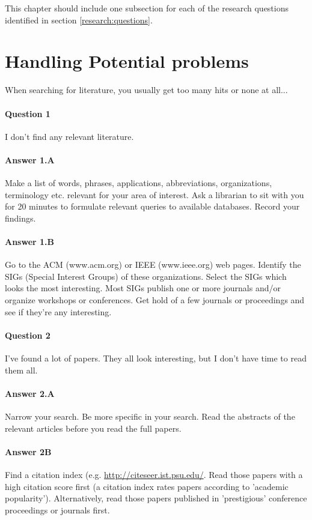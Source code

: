 \documentclass[informationsecurity]{gucmasterproject}
\begin{document}
This chapter should include one subsection for each of the research
questions identified in section \ref{research:questions}.  

\section{Handling Potential problems}
When searching for literature, you usually get too many hits or none at all...

\paragraph{Question 1} I don't find any relevant literature.

\paragraph{Answer 1.A}  Make a list of words, phrases, applications, abbreviations,
organizations, terminology etc. relevant for your area of interest.
Ask a librarian to sit with you for 20 minutes to formulate relevant
queries to available databases.  Record your findings.

\paragraph{Answer 1.B}  Go to the ACM (www.acm.org) or IEEE (www.ieee.org) web pages.
Identify the SIGs (Special Interest Groups) of these organizations.
Select the SIGs which looks the most interesting.
Most SIGs publish one or more journals and/or organize workshops or conferences.
Get hold of a few journals or proceedings and see if they're any interesting.


\paragraph{Question 2}  I've found a lot of papers.
They all look interesting, but I don't have time to read them all.

\paragraph{Answer 2.A}  Narrow your search.  Be more specific in your search.  Read the abstracts of the relevant articles before you read the full papers.

\paragraph{Answer 2B}  Find a citation index (e.g. \url{http://citeseer.ist.psu.edu/}.
Read those papers with a high citation score first
(a citation index rates papers according to 'academic popularity').  Alternatively,
read those papers published in 'prestigious' conference proceedings or journals first.
\end{document}
